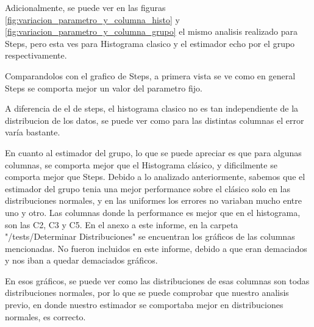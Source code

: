 Adicionalmente, se puede ver en las figuras \ref{fig:variacion_parametro_y_columna_histo} y \ref{fig:variacion_parametro_y_columna_grupo} el mismo analisis realizado para Steps, pero esta ves para Histograma clasico y el estimador echo por el grupo respectivamente.

	Comparandolos con el grafico de Steps, a primera vista se ve como en general Steps se comporta mejor un valor del parametro fijo. 
	
	A diferencia de el de steps, el histograma clasico no es tan independiente de la distribucion de los datos, se puede ver como para las distintas columnas el error var\'ia bastante. 
	
	En cuanto al estimador del grupo, lo que se puede apreciar es que para algunas columnas, se comporta mejor que el Histograma cl\'asico, y dificilmente se comporta mejor que Steps. Debido a lo analizado anteriormente, sabemos que el estimador del grupo tenia una mejor performance sobre el cl\'asico solo en las distribuciones normales, y en las uniformes los errores no variaban mucho entre uno y otro. Las columnas donde la performance es mejor que en el histograma, son las C2, C3 y C5. En el anexo a este informe, en la carpeta "/tests/Determinar Distribuciones" se encuentran los gr\'aficos de las columnas mencionadas. No fueron incluidos en este informe, debido a que eran demaciados y nos iban a quedar demaciados gr\'aficos.
	
	En esos gr\'aficos, se puede ver como las distribuciones de esas columnas son todas distribuciones normales, por lo que se puede comprobar que nuestro analisis previo, en donde nuestro estimador se comportaba mejor en distribuciones normales, es correcto.
	